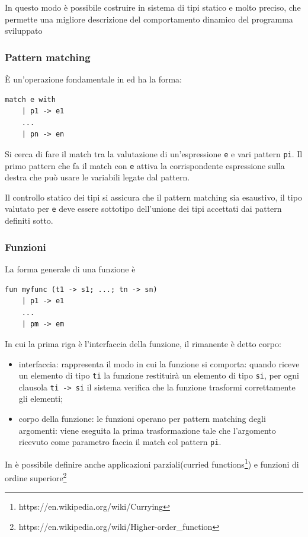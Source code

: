 In questo modo è possibile costruire in sistema di tipi statico e molto preciso, che permette una migliore descrizione del comportamento dinamico del programma sviluppato
\subsubsection{Pattern matching}
\label{CDucePattern}
È un'operazione fondamentale in \cduce ed ha la forma:
\begin{verbatim}
match e with
	| p1 -> e1
	...
	| pn -> en
\end{verbatim}
Si cerca di fare il match tra la valutazione di un'espressione \verb|e| e vari pattern \verb|pi|. Il primo pattern che fa il match con \verb|e| attiva la corrispondente espressione sulla destra che può usare le variabili legate dal pattern.

Il controllo statico dei tipi si assicura che il pattern matching sia esaustivo, il tipo valutato per \verb|e| deve essere sottotipo dell'unione dei tipi accettati dai pattern definiti sotto.
\subsubsection{Funzioni}
La forma generale di una funzione è
\begin{verbatim}
fun myfunc (t1 -> s1; ...; tn -> sn)
	| p1 -> e1
	...
	| pm -> em
\end{verbatim}
In cui la prima riga è l'interfaccia della funzione, il rimanente è detto corpo:
\begin{itemize}
	\item interfaccia: rappresenta il modo in cui la funzione si comporta: quando riceve un elemento di tipo \verb|ti| la funzione restituirà un elemento di tipo \verb|si|, per ogni clausola \verb|ti -> si| il sistema verifica che la funzione trasformi correttamente gli elementi;
	\item corpo della funzione: le funzioni operano per pattern matching degli argomenti: viene eseguita la prima trasformazione tale che l'argomento ricevuto come parametro faccia il match col pattern \verb|pi|. 
\end{itemize}
In \cduce è possibile definire anche applicazioni parziali(curried functions\footnote{https://en.wikipedia.org/wiki/Currying}) e funzioni di ordine superiore\footnote{https://en.wikipedia.org/wiki/Higher-order\_function}
